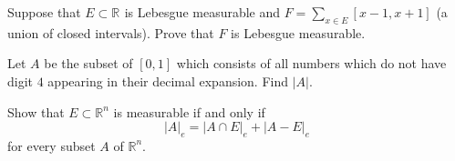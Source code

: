 \begin{solution}
\end{solution}

\begin{problem}{4}
Suppose that $E \subset \mathbb{R}^{}$ is Lebesgue measurable and $F = \sum_{x \in E}^{} \left[ x-1,x+1 \right]$ (a union of closed intervals).
Prove that $F$ is Lebesgue measurable.
\end{problem}

\begin{solution}
\end{solution}

\begin{problem}{5}
Let $A$ be the subset of $\left[ 0,1 \right]$ which consists of all numbers which do not have digit $4$ appearing in their decimal expansion.
Find $\left| A \right|$.
\end{problem}

\begin{solution}
\end{solution}

\begin{problem}{6}
Show that $E \subset \mathbb{R}^{n}$ is measurable if and only if 
\[
\left| A \right|_{e } = \left| A \cap E  \right|_{e} + \left| A - E  \right|_{e}
\] 
for every subset $A$ of $\mathbb{R}^{n}$.
\end{problem}

\begin{solution}
\end{solution}
